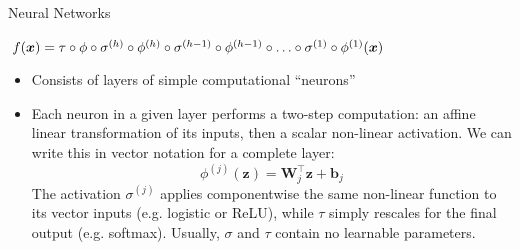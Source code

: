 \begin{vbframe}{Neural Networks}

$f(\bm{x}) = \tau \circ \phi \circ \sigma^{(h)} \circ \phi^{(h)} \circ \sigma^{(h-1)} \circ \phi^{(h-1)} \circ \ldots \circ \sigma^{(1)} \circ \phi^{(1)} (\bm{x})$

\begin{figure}
  \centering
\end{figure}

\begin{itemize}
  \item Consists of layers of simple computational \enquote{neurons} 
  \item Each neuron in a given layer performs a two-step computation: an affine linear transformation of its inputs, then a scalar non-linear activation. We can write this in vector notation for a complete layer:
  $$
    \phi^{(j)}(\bm{z}) = \bm{W}_j^\top \bm{z} + \bm{b}_j 
  $$
  The activation $\sigma^{(j)}$ applies componentwise the same non-linear function to its vector inputs (e.g. logistic or ReLU), while $\tau$ simply rescales for the final output (e.g. softmax). 
  Usually, $\sigma$ and $\tau$ contain no learnable parameters.
\end{itemize}

\end{vbframe}


\endlecture



